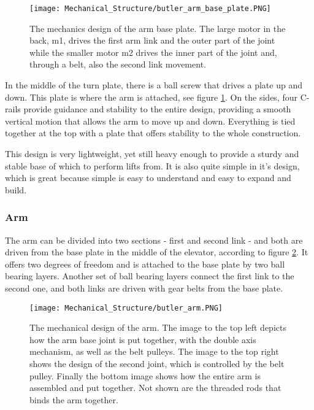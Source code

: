 \begin{figure}[!ht]
    \centering
    \texttt{[image: Mechanical\_Structure/butler\_arm\_base\_plate.PNG]}
    \caption{The mechanics design of the arm base plate. The large motor in the back, m1, drives the first arm link and the outer part of the joint while the smaller motor m2 drives the inner part of the joint and, through a belt, also the second link movement.}
    \label{fig:arm_base_plate}
\end{figure}

In the middle of the turn plate, there is a ball screw that drives a plate up and down. This plate is where the arm is attached, see figure \ref{fig:arm_base_plate}. On the sides, four C-rails provide guidance and stability to the entire design, providing a smooth vertical motion that allows the arm to move up and down. Everything is tied together at the top with a plate that offers stability to the whole construction.

This design is very lightweight, yet still heavy enough to provide a sturdy and stable base of which to perform lifts from. It is also quite simple in it's design, which is great because simple is easy to understand and easy to expand and build.
    

\subsubsection{Arm}

The arm can be divided into two sections - first and second link - and both are driven from the base plate in the middle of the elevator, according to figure \ref{fig:arm_mechanics}. It offers two degrees of freedom and is attached to the base plate by two ball bearing layers. Another set of ball bearing layers connect the first link to the second one, and both links are driven with gear belts from the base plate.

\begin{figure}[!ht]
    \centering
    \texttt{[image: Mechanical\_Structure/butler\_arm.PNG]}
    \caption{The mechanical design of the arm. The image to the top left depicts how the arm base joint is put together, with the double axis mechanism, as well as the belt pulleys. The image to the top right shows the design of the second joint, which is controlled by the belt pulley. Finally the bottom image shows how the entire arm is assembled and put together. Not shown are the threaded rods that binds the arm together.}
    \label{fig:arm_mechanics}
\end{figure}

